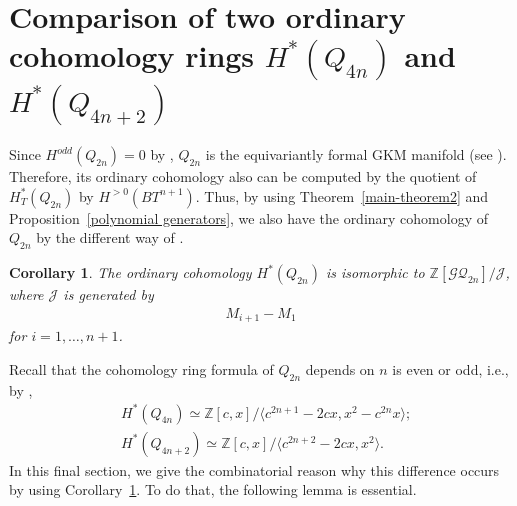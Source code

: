 \documentclass[12pt]{amsart}
\newtheorem{corollary}[theorem]{Corollary}
\theoremstyle{remark}
\numberwithin{equation}{section}
\begin{document}
\section{Comparison of two ordinary cohomology rings $H^{*}(Q_{4n})$ and $H^{*}(Q_{4n+2})$}
\label{sect:7}

Since $H^{odd}(Q_{2n})=0$ by \cite{La74}, $Q_{2n}$ is the equivariantly formal GKM manifold (see \cite{GKM}).
Therefore, its ordinary cohomology also can be computed by the quotient of $H_{T}^{*}(Q_{2n})$ by $H^{>0}(BT^{n+1})$.
Thus, by using Theorem~\ref{main-theorem2} and Proposition~\ref{polynomial generators}, we also have the ordinary cohomology of $Q_{2n}$ by the different way of \cite{La74}.
\begin{corollary}
\label{main-corollary}
The ordinary cohomology $H^{*}(Q_{2n})$ is isomorphic to $\mathbb{Z}[\mathcal{GQ}_{2n}]/\mathcal{J}$, where $\mathcal{J}$ is generated by
\begin{align*}
M_{i+1}-M_{1}
\end{align*}
for $i=1,\ldots, n+1$.
\end{corollary}

Recall that the cohomology ring formula of $Q_{2n}$ depends on $n$ is even or odd, i.e., by \cite{La74}, 
\begin{align*}
& H^{*}(Q_{4n})\simeq \mathbb{Z}[c,x]/\langle c^{2n+1}-2cx, x^{2}- c^{2n}x \rangle; \\
& H^{*}(Q_{4n+2})\simeq \mathbb{Z}[c,x]/\langle c^{2n+2}-2cx, x^{2} \rangle.
\end{align*}
In this final section, 
we give the combinatorial reason why this difference occurs by using 
Corollary~\ref{main-corollary}.
To do that, 
the following lemma is essential.
\end{document}
